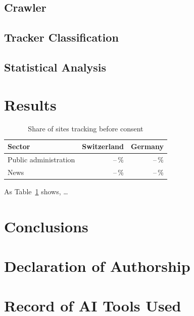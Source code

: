 \documentclass[conference]{IEEEtran}
\begin{document}
\subsection{Crawler}
\subsection{Tracker Classification}
\subsection{Statistical Analysis}

\section{Results}


\begin{table}[t]
  \centering
  \caption{Share of sites tracking before consent}
  \label{tab:share}
  \begin{tabular}{lrr}
    \toprule
    Sector & Switzerland & Germany \\
    \midrule
    Public administration & --\,\% & --\,\% \\
    News                  & --\,\% & --\,\% \\
    \bottomrule
  \end{tabular}
\end{table}

As Table~\ref{tab:share} shows, \ldots

\section{Conclusions}




\clearpage
\onecolumn
\appendices
\section{Declaration of Authorship}

\section{Record of AI Tools Used}
\end{document}

